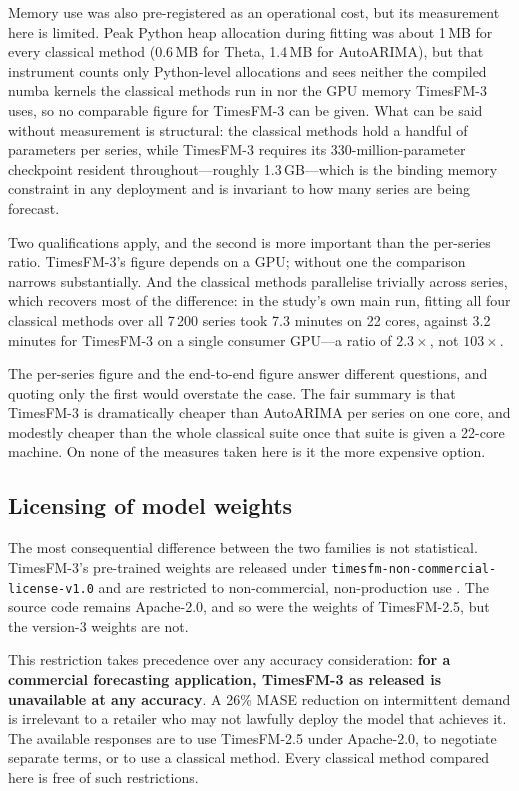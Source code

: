 \documentclass[11pt]{article}
\newcommand{\pkg}[1]{\textsf{#1}}
\newcommand{\proglang}[1]{\textsf{#1}}
\newcommand{\code}[1]{\texttt{#1}}
\begin{document}
Memory use was also pre-registered as an operational cost, but its measurement here is limited. Peak \proglang{Python} heap allocation during fitting was about 1\,MB
for every classical method (0.6\,MB for Theta, 1.4\,MB for AutoARIMA), but that instrument counts
only \proglang{Python}-level allocations and sees neither the compiled \pkg{numba} kernels the
classical methods run in nor the GPU memory TimesFM-3 uses, so no comparable figure for TimesFM-3
can be given. What can be said without measurement is structural: the classical methods hold a
handful of parameters per series, while TimesFM-3 requires its 330-million-parameter checkpoint
resident throughout---roughly 1.3\,GB---which is the binding memory constraint in any deployment
and is invariant to how many series are being forecast.

Two qualifications apply, and the second is more important than the per-series ratio.
TimesFM-3's figure depends on a GPU; without one the comparison narrows substantially. And the
classical methods parallelise trivially across series, which recovers most of the difference: in
the study's own main run, fitting all four classical methods over all 7\,200 series took 7.3
minutes on 22 cores, against 3.2 minutes for TimesFM-3 on a single consumer GPU---a ratio of
$2.3\times$, not $103\times$.

The per-series figure and the end-to-end figure answer different questions, and quoting only the
first would overstate the case. The fair summary is that TimesFM-3 is dramatically cheaper than
AutoARIMA per series on one core, and modestly cheaper than the whole classical suite once that
suite is given a 22-core machine. On none of the measures taken here is it the more expensive
option.

\subsection{Licensing of model weights}
\label{sec:licence}

The most consequential difference between the two families is not statistical. TimesFM-3's
pre-trained weights are released under \code{timesfm-non-commercial-license-v1.0} and are
restricted to non-commercial, non-production use \citep{timesfm3repo}. The source code remains
Apache-2.0, and so were the weights of TimesFM-2.5, but the version-3 weights are not.

This restriction takes precedence over any accuracy consideration: \textbf{for a
commercial forecasting application, TimesFM-3 as released is unavailable at any accuracy}. A
26\% MASE reduction on intermittent demand is irrelevant to a retailer who may not lawfully
deploy the model that achieves it. The available responses are to use TimesFM-2.5 under
Apache-2.0, to negotiate separate terms, or to use a classical method. Every classical method
compared here is free of such restrictions.
\end{document}
